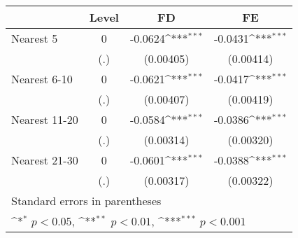 {
\def\sym#1{\ifmmode^{#1}\else\(^{#1}\)\fi}
\begin{tabular}{l*{3}{c}}
\hline\hline
            &\multicolumn{1}{c}{Level}&\multicolumn{1}{c}{FD}&\multicolumn{1}{c}{FE}\\
\hline
Nearest 5   &           0         &     -0.0624\sym{***}&     -0.0431\sym{***}\\
            &         (.)         &   (0.00405)         &   (0.00414)         \\
[1em]
Nearest 6-10&           0         &     -0.0621\sym{***}&     -0.0417\sym{***}\\
            &         (.)         &   (0.00407)         &   (0.00419)         \\
[1em]
Nearest 11-20&           0         &     -0.0584\sym{***}&     -0.0386\sym{***}\\
            &         (.)         &   (0.00314)         &   (0.00320)         \\
[1em]
Nearest 21-30&           0         &     -0.0601\sym{***}&     -0.0388\sym{***}\\
            &         (.)         &   (0.00317)         &   (0.00322)         \\
\hline\hline
\multicolumn{4}{l}{\footnotesize Standard errors in parentheses}\\
\multicolumn{4}{l}{\footnotesize \sym{*} \(p<0.05\), \sym{**} \(p<0.01\), \sym{***} \(p<0.001\)}\\
\end{tabular}
}
